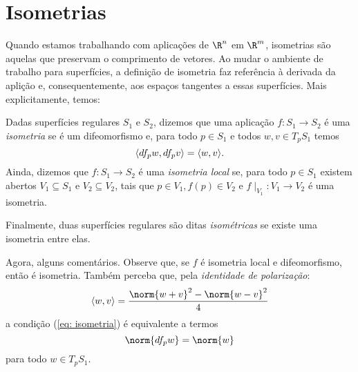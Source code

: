 \section{Isometrias}

Quando estamos trabalhando com aplicações de \( \R^{ n } \) em \( \R^{ m } \), isometrias são aquelas que preservam o comprimento de vetores.
Ao mudar o ambiente de trabalho para superfícies, a definição de isometria faz referência à derivada da aplição e, consequentemente, aos espaços tangentes a essas superfícies.
Mais explicitamente, temos:
\begin{defn}[Isometria]
    Dadas superfícies regulares \( S_{ 1 } \) e \( S_{ 2 } \), dizemos que uma aplicação \( f : S_{ 1 } \to S_{ 2 } \) é uma \emph{isometria} se é um difeomorfismo e, para todo \( p \in S_{ 1 } \) e todos \( w, v \in T_{ p } S_{ 1 } \) temos
    \begin{equation}
        \langle df_{ p } w, df_{ p } v \rangle = \langle w, v \rangle
        \label{eq: isometria}
    .\end{equation}
    Ainda, dizemos que \( f : S_{ 1 } \to S_{ 2 } \) é uma \emph{isometria local} se, para todo \( p \in S_{ 1 } \) existem abertos \( V_{ 1 } \subseteq S_{ 1 } \) e \( V_{ 2 } \subseteq V_{ 2 } \), tais que \( p \in V_{ 1 }, f ( p ) \in V_{ 2 } \) e \( f \mid_{ V_{ 1 } } : V_{ 1 } \to V_{ 2 } \) é uma isometria.

Finalmente, duas superfícies regulares são ditas \emph{isométricas} se existe uma isometria entre elas.
\end{defn}

Agora, alguns comentários.
Observe que, se \( f \) é isometria local e difeomorfismo, então é isometria.
Também perceba que, pela \emph{identidade de polarização}:
\begin{equation*}
    \dotprod{ w, v } = \frac{ \norm{ w + v }^2 - \norm{ w - v }^2 }{ 4 }
\end{equation*}
a condição (\ref{eq: isometria}) é equivalente a termos
\begin{equation}
    \norm{ df_{ p }w } = \norm{ w }
    \label{eq: isometria2}
\end{equation}
para todo \( w \in T_{ p } S_{ 1 } \).

